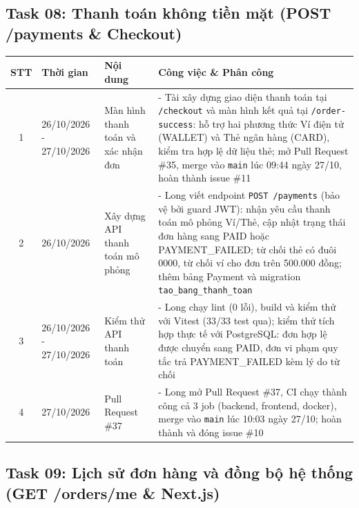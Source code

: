 \documentclass[12pt, a4paper]{article}
\begin{document}
\subsection*{Task 08: Thanh toán không tiền mặt (POST /payments \& Checkout)}

\begin{tabularx}{\textwidth}{|c|p{3.2cm}|Y|Y|}
    \hline
    \textbf{STT} & \textbf{Thời gian} & \textbf{Nội dung} & \textbf{Công việc \& Phân công} \\
    \hline

    1 & 26/10/2026 - 27/10/2026 & Màn hình thanh toán và xác nhận đơn &
    - Tài xây dựng giao diện thanh toán tại \texttt{/checkout} và màn hình kết quả tại \texttt{/order-success}: hỗ trợ hai phương thức Ví điện tử (WALLET) và Thẻ ngân hàng (CARD), kiểm tra hợp lệ dữ liệu thẻ; mở Pull Request \#35, merge vào \texttt{main} lúc 09:44 ngày 27/10, hoàn thành issue \#11 \\
    \hline

    2 & 26/10/2026 & Xây dựng API thanh toán mô phỏng &
    - Long viết endpoint \texttt{POST /payments} (bảo vệ bởi guard JWT): nhận yêu cầu thanh toán mô phỏng Ví/Thẻ, cập nhật trạng thái đơn hàng sang PAID hoặc PAYMENT\_FAILED; từ chối thẻ có đuôi 0000, từ chối ví cho đơn trên 500.000 đồng; thêm bảng Payment và migration \texttt{tao\_bang\_thanh\_toan} \\
    \hline

    3 & 26/10/2026 - 27/10/2026 & Kiểm thử API thanh toán &
    - Long chạy lint (0 lỗi), build và kiểm thử với Vitest (33/33 test qua); kiểm thử tích hợp thực tế với PostgreSQL: đơn hợp lệ được chuyển sang PAID, đơn vi phạm quy tắc trả PAYMENT\_FAILED kèm lý do từ chối \\
    \hline

    4 & 27/10/2026 & Pull Request \#37 &
    - Long mở Pull Request \#37, CI chạy thành công cả 3 job (backend, frontend, docker), merge vào \texttt{main} lúc 10:03 ngày 27/10; hoàn thành và đóng issue \#10 \\
    \hline
\end{tabularx}

\vspace{0.8cm}

\subsection*{Task 09: Lịch sử đơn hàng và đồng bộ hệ thống (GET /orders/me \& Next.js)}
\end{document}
